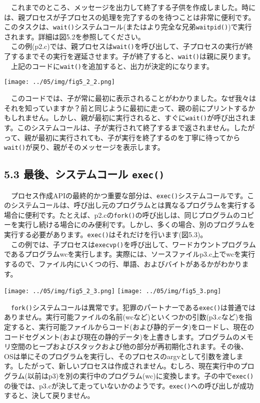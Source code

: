 　これまでのところ、メッセージを出力して終了する子供を作成しました。時には、親プロセスが子プロセスの処理を完了するのを待つことは非常に便利です。このタスクは、\texttt{wait()}システムコール(またはより完全な兄弟\texttt{waitpid()})で実行されます。詳細は図5.2を参照してください。\\
　この例(p2.c)では、親プロセスは\texttt{wait()}を呼び出して、子プロセスの実行が終了するまでその実行を遅延させます。子が終了すると、\texttt{wait()}は親に戻ります。\\
　上記のコードに\texttt{wait()}を追加すると、出力が決定的になります。

\texttt{[image: ../05/img/fig5\_2\_2.png]}

　このコードでは、子が常に最初に表示されることがわかりました。なぜ我々はそれを知っていますか？前と同じように最初に走って、親の前にプリントするかもしれません。しかし、親が最初に実行されると、すぐに\texttt{wait()}が呼び出されます。このシステムコールは、子が実行されて終了するまで返されません。したがって、親が最初に実行されても、子が実行を終了するのを丁寧に待ってから\texttt{wait()}が戻り、親がそのメッセージを表示します。

\hypertarget{ux6700ux5f8cux30b7ux30b9ux30c6ux30e0ux30b3ux30fcux30eb-exec}{%
\subsection*{\texorpdfstring{5.3 最後、システムコール
\texttt{exec()}}{5.3 最後、システムコール exec()}}\label{ux6700ux5f8cux30b7ux30b9ux30c6ux30e0ux30b3ux30fcux30eb-exec}}

　プロセス作成APIの最終的かつ重要な部分は、\texttt{exec()}システムコールです。このシステムコールは、呼び出し元のプログラムとは異なるプログラムを実行する場合に便利です。たとえば、p2.cの\texttt{fork()}の呼び出しは、同じプログラムのコピーを実行し続ける場合にのみ便利です。しかし、多くの場合、別のプログラムを実行する必要があります。\texttt{exec()}はそれだけを行います(図5.3)。\\
　この例では、子プロセスは\texttt{execvp()}を呼び出して、ワードカウントプログラムであるプログラムwcを実行します。実際には、ソースファイルp3.c上でwcを実行するので、ファイル内にいくつの行、単語、およびバイトがあるかがわかります。

\texttt{[image: ../05/img/fig5\_2\_3.png]}
\texttt{[image: ../05/img/fig5\_3.png]}

　\texttt{fork()}システムコールは異常です。犯罪のパートナーである\texttt{exec()}は普通ではありません。実行可能ファイルの名前(wcなど)といくつかの引数(p3.cなど)を指定すると、実行可能ファイルからコード(および静的データ)をロードし、現在のコードセグメント(および現在の静的データ)を上書きします。プログラムのメモリ空間のヒープおよびスタックおよび他の部分が再初期化されます。その後、OSは単にそのプログラムを実行し、そのプロセスのargvとして引数を渡します。したがって、新しいプロセスは作成されません。むしろ、現在実行中のプログラム(以前はp3)を別の実行中のプログラム(wc)に変換します。子の中で\texttt{exec()}の後では、p3.cが決して走っていないかのようです。\texttt{exec()}への呼び出しが成功すると、決して戻りません。

